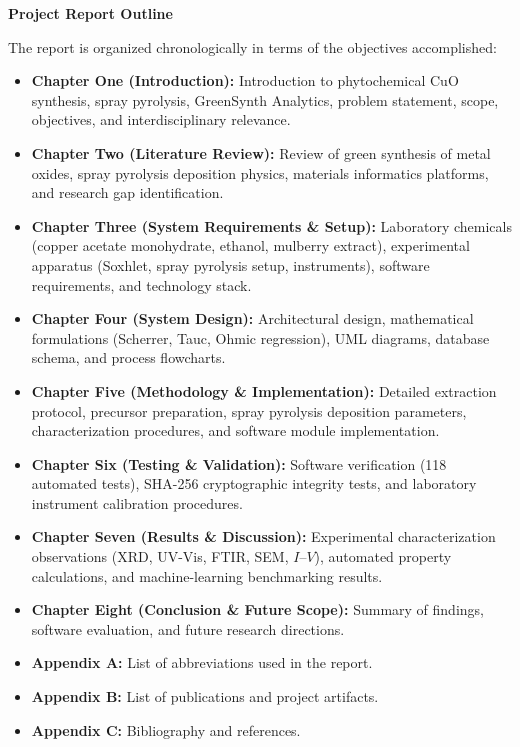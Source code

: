 \documentclass[12pt,a4paper,oneside]{report}
\begin{document}
{{{\newpage
\begin{center}
\textbf{Project Report Outline}\\
\end{center}
 The report is organized chronologically in terms of the objectives accomplished:
 \begin{itemize}
   \item \textbf{Chapter One (Introduction):} Introduction to phytochemical $\text{CuO}$ synthesis, spray pyrolysis, GreenSynth Analytics, problem statement, scope, objectives, and interdisciplinary relevance.
   \item \textbf{Chapter Two (Literature Review):} Review of green synthesis of metal oxides, spray pyrolysis deposition physics, materials informatics platforms, and research gap identification.
   \item \textbf{Chapter Three (System Requirements \& Setup):} Laboratory chemicals (copper acetate monohydrate, ethanol, mulberry extract), experimental apparatus (Soxhlet, spray pyrolysis setup, instruments), software requirements, and technology stack.
   \item \textbf{Chapter Four (System Design):} Architectural design, mathematical formulations (Scherrer, Tauc, Ohmic regression), UML diagrams, database schema, and process flowcharts.
   \item \textbf{Chapter Five (Methodology \& Implementation):} Detailed extraction protocol, precursor preparation, spray pyrolysis deposition parameters, characterization procedures, and software module implementation.
   \item \textbf{Chapter Six (Testing \& Validation):} Software verification (118 automated tests), SHA-256 cryptographic integrity tests, and laboratory instrument calibration procedures.
   \item \textbf{Chapter Seven (Results \& Discussion):} Experimental characterization observations (XRD, UV-Vis, FTIR, SEM, $I\text{--}V$), automated property calculations, and machine-learning benchmarking results.
   \item \textbf{Chapter Eight (Conclusion \& Future Scope):} Summary of findings, software evaluation, and future research directions.
   \item \textbf{Appendix A:} List of abbreviations used in the report.
   \item \textbf{Appendix B:} List of publications and project artifacts.
   \item \textbf{Appendix C:} Bibliography and references.
 \end{itemize}





}}}
\end{document}
